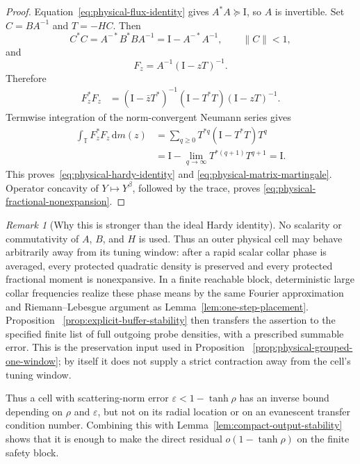 \documentclass[11pt]{article}
\theoremstyle{remark}
\newtheorem{remark}[theorem]{Remark}
\newcommand{\T}{\mathbb T}
\newcommand{\Id}{\mathrm I}
\newcommand{\dd}{\,\mathrm d}
\begin{document}
\begin{proof}
Equation~\eqref{eq:physical-flux-identity} gives $A^*A\succeq\Id$, so
$A$ is invertible.  Set $C=BA^{-1}$ and $T=-HC$.  Then
\begin{equation}
 C^*C
 =A^{-*}B^*BA^{-1}
 =\Id-A^{-*}A^{-1},
 \qquad \|C\|<1,
 \label{eq:physical-defect-identity}
\end{equation}
and
\[
 F_z=A^{-1}(\Id-zT)^{-1}.
\]
Therefore
\begin{align*}
 F_z^*F_z
 &=(\Id-\bar zT^*)^{-1}
   (\Id-T^*T)(\Id-zT)^{-1}.
\end{align*}
Termwise integration of the norm-convergent Neumann series gives
\begin{align*}
 \int_{\T}F_z^*F_z\dd m(z)
 &=\sum_{q\geq0}T^{*q}(\Id-T^*T)T^q\\
 &=\Id-\lim_{q\to\infty}T^{*(q+1)}T^{q+1}=\Id.
\end{align*}
This proves~\eqref{eq:physical-hardy-identity} and
\eqref{eq:physical-matrix-martingale}.  Operator concavity of
$Y\mapsto Y^\beta$, followed by the trace, proves
\eqref{eq:physical-fractional-nonexpansion}.
\end{proof}

\begin{remark}[Why this is stronger than the ideal Hardy identity]
\label{rem:physical-hardy-meaning}
No scalarity or commutativity of $A$, $B$, and $H$ is used.  Thus an outer
physical cell may behave arbitrarily away from its tuning window: after a
rapid scalar collar phase is averaged, every protected quadratic density is
preserved and every protected fractional moment is nonexpansive.  In a finite
reachable block, deterministic large collar frequencies realize these phase
means by the same Fourier approximation and Riemann--Lebesgue argument as
Lemma~\ref{lem:one-step-placement}.  Proposition
~\ref{prop:explicit-buffer-stability} then transfers the assertion to the
 specified finite list of full outgoing probe densities, with a prescribed
 summable error.  This is the preservation input used in Proposition
 ~\ref{prop:physical-grouped-one-window}; by itself it does not supply a strict
 contraction away from the cell's tuning window.
\end{remark}

Thus a cell with scattering-norm error $\varepsilon<1-\tanh\rho$ has an
inverse bound depending on $\rho$ and $\varepsilon$, but not on its radial
location or on an evanescent transfer condition number.  Combining this with
Lemma~\ref{lem:compact-output-stability} shows that it is enough to make the
direct residual $o(1-\tanh\rho)$ on the finite safety block.
\end{document}
